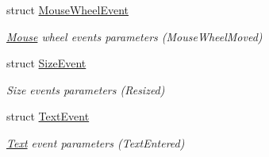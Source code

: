 \begin{DoxyCompactItemize}
struct \hyperlink{structsf_1_1_event_1_1_mouse_wheel_event}{Mouse\-Wheel\-Event}
\begin{DoxyCompactList}\small\item\em \hyperlink{classsf_1_1_mouse}{Mouse} wheel events parameters (Mouse\-Wheel\-Moved) \end{DoxyCompactList}\item 
struct \hyperlink{structsf_1_1_event_1_1_size_event}{Size\-Event}
\begin{DoxyCompactList}\small\item\em Size events parameters (Resized) \end{DoxyCompactList}\item 
struct \hyperlink{structsf_1_1_event_1_1_text_event}{Text\-Event}
\begin{DoxyCompactList}\small\item\em \hyperlink{classsf_1_1_text}{Text} event parameters (Text\-Entered) \end{DoxyCompactList}\end{DoxyCompactItemize}
